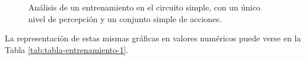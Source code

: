\begin{figure}[ht!]
    \begin{center}
        \hspace{0.1cm}
    \end{center}
  \centering
  \captionsetup{justification=centering,margin=2cm}
  \caption{Análisis de un entrenamiento en el circuito simple, con un único nivel de percepción y un conjunto simple de acciones.}
  \label{fig:entrenamiento-1}
\end{figure}

La representación de estas mismas gráficas en valores numéricos puede verse en la Tabla \ref{tab:tabla-entrenamiento-1}.


